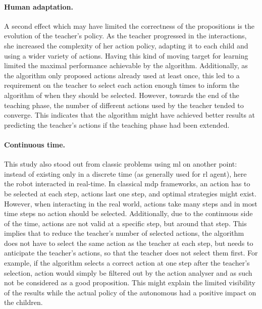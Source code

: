 \paragraph{Human adaptation.}
A second effect which may have limited the correctness of the propositions is the evolution of the teacher's policy. As the teacher progressed in the interactions, she increased the complexity of her action policy, adapting it to each child and using a wider variety of actions. Having this kind of moving target for learning limited the maximal performance achievable by the algorithm. Additionally, as the algorithm only proposed actions already used at least once, this led to a requirement on the teacher to select each action enough times to inform the algorithm of when they should be selected. However, towards the end of the teaching phase, the number of different actions used by the teacher tended to converge. This indicates that the algorithm might have achieved better results at predicting the teacher's actions if the teaching phase had been extended.

\paragraph{Continuous time.}

This study also stood out from classic problems using \gls{ml} on another point: instead of existing only in a discrete time (as generally used for \gls{rl} agent), here the robot interacted in real-time. In classical \gls{mdp} frameworks, an action has to be selected at each step, actions last one step, and optimal strategies might exist. However, when interacting in the real world, actions take many steps and in most time steps no action should be selected. Additionally, due to the continuous side of the time, actions are not valid at a specific step, but around that step. This implies that to reduce the teacher's number of selected actions, the algorithm does not have to select the same action as the teacher at each step, but needs to anticipate the teacher's actions, so that the teacher does not select them first. For example, if the algorithm selects a correct action at one step after the teacher's selection, action would simply be filtered out by the action analyser and as such not be considered as a good proposition. This might explain the limited visibility of the results while the actual policy of the autonomous had a positive impact on the children.


